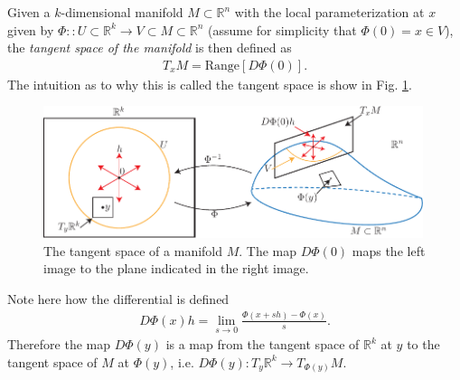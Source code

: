 \begin{definition}
	Given a $k$-dimensional manifold $M\subset \mathbb{R}^{n}$ with the local parameterization at $x$ given by $\Phi:: U\subset \mathbb{R}^k \to V\subset M \subset \mathbb{R}^n$ (assume for simplicity that $\Phi(0)=x\in V$), the \emph{tangent space of the manifold} is then defined as
	\begin{align}
		\boxed{
			T_{x}M= \textrm{Range} [D\Phi(0)].
		}
	\end{align}
	The intuition as to why this is called the tangent space is show in Fig. \ref{fig:tangent_space_def}.
	\begin{figure}[h!]
		\centering
		\includegraphics[width=0.99\textwidth]{figures/ch9/6tangent_space_def.pdf}
		\caption{The tangent space of a manifold $M$. The map $D\Phi(0)$ maps the left image to the plane indicated in the right image.}
		\label{fig:tangent_space_def}
	\end{figure}
\end{definition}

Note here how the differential is defined
\begin{align}
	D \Phi(x)h = \lim_{s \to 0} \frac{\Phi(x + sh) - \Phi(x)}{s}.
\end{align}
Therefore the map $D\Phi(y)$ is a map from the tangent space of $\mathbb{R}^{k}$ at $y$ to the tangent space of $M$ at $\Phi(y)$, i.e. $D\Phi(y): T_{y}\mathbb{R}^{k}\to T_{\Phi(y)}M$. 

